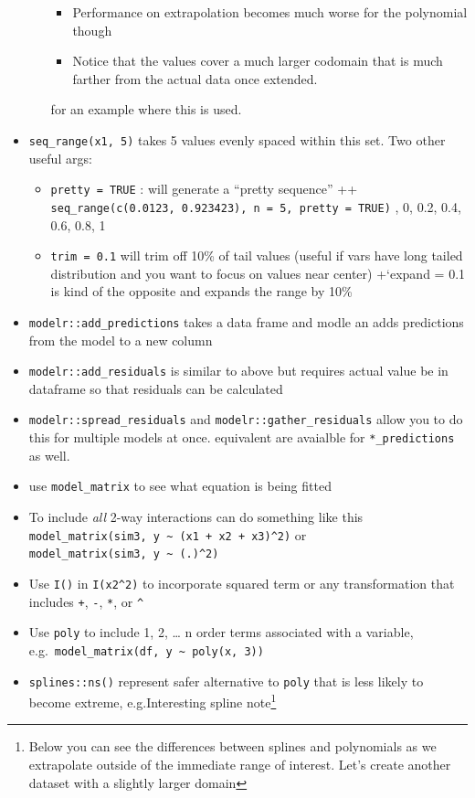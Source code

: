\documentclass[]{book}
\providecommand{\tightlist}{%
  \setlength{\itemsep}{0pt}\setlength{\parskip}{0pt}}
\let\rmarkdownfootnote\footnote%
\def\footnote{\protect\rmarkdownfootnote}
\theoremstyle{definition}
\theoremstyle{definition}
\theoremstyle{definition}
\theoremstyle{remark}
\begin{document}
\begin{itemize}
\begin{itemize}
{      \begin{itemize}
      \tightlist
      \item
        Performance on extrapolation becomes much worse for the
        polynomial though
      \item
        Notice that the values cover a much larger codomain that is much
        farther from the actual data once extended.
      \end{itemize}} for an example where this is used.
  \end{itemize}
\item
  \texttt{seq\_range(x1,\ 5)} takes 5 values evenly spaced within this
  set. Two other useful args:

  \begin{itemize}
  \tightlist
  \item
    \texttt{pretty\ =\ TRUE} : will generate a ``pretty sequence'' ++
    \texttt{seq\_range(c(0.0123,\ 0.923423),\ n\ =\ 5,\ pretty\ =\ TRUE)}
    , 0, 0.2, 0.4, 0.6, 0.8, 1
  \item
    \texttt{trim\ =\ 0.1} will trim off 10\% of tail values (useful if
    vars have long tailed distribution and you want to focus on values
    near center) +`expand = 0.1 is kind of the opposite and expands the
    range by 10\%
  \end{itemize}
\item
  \texttt{modelr::add\_predictions} takes a data frame and modle an adds
  predictions from the model to a new column
\item
  \texttt{modelr::add\_residuals} is similar to above but requires
  actual value be in dataframe so that residuals can be calculated
\item
  \texttt{modelr::spread\_residuals} and
  \texttt{modelr::gather\_residuals} allow you to do this for multiple
  models at once. equivalent are avaialble for \texttt{*\_predictions}
  as well.
\item
  use \texttt{model\_matrix} to see what equation is being fitted
\item
  To include \emph{all} 2-way interactions can do something like this
  \texttt{model\_matrix(sim3,\ y\ \textasciitilde{}\ (x1\ +\ x2\ +\ x3)\^{}2)}
  or \texttt{model\_matrix(sim3,\ y\ \textasciitilde{}\ (.)\^{}2)}
\item
  Use \texttt{I()} in \texttt{I(x2\^{}2)} to incorporate squared term or
  any transformation that includes \texttt{+}, \texttt{-}, \texttt{*},
  or \texttt{\^{}}
\item
  Use \texttt{poly} to include 1, 2, \ldots{} n order terms associated
  with a variable,
  e.g.~\texttt{model\_matrix(df,\ y\ \textasciitilde{}\ poly(x,\ 3))}
\item
  \texttt{splines::ns()} represent safer alternative to \texttt{poly}
  that is less likely to become extreme, e.g.Interesting spline
  note\footnote{Below you can see the differences between splines and
    polynomials as we extrapolate outside of the immediate range of
    interest. Let's create another dataset with a slightly larger domain

}
\end{itemize}
\end{document}
